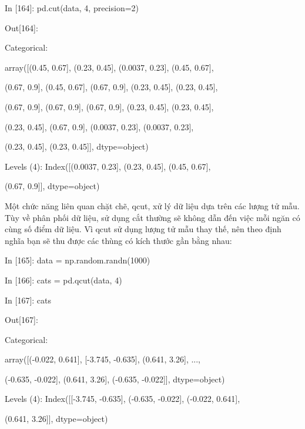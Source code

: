    \quad\textup{In [164]: pd.cut(data, 4, precision=2)  }\par
    \quad\textup{Out[164]: }\par
    \quad\textup{Categorical:   }\par
    \quad\textup{array([(0.45, 0.67], (0.23, 0.45], (0.0037, 0.23], (0.45, 0.67], }\par
    \quad\textup{\quad\quad (0.67, 0.9], (0.45, 0.67], (0.67, 0.9], (0.23, 0.45], (0.23, 0.45],    }\par
    \quad\textup{\quad\quad (0.67, 0.9], (0.67, 0.9], (0.67, 0.9], (0.23, 0.45], (0.23, 0.45], }\par
    \quad\textup{\quad\quad  (0.23, 0.45], (0.67, 0.9], (0.0037, 0.23], (0.0037, 0.23],  }\par
    \quad\textup{\quad\quad  (0.23, 0.45], (0.23, 0.45]], dtype=object) }\par
    \quad\textup{Levels (4): Index([(0.0037, 0.23], (0.23, 0.45], (0.45, 0.67], }\par
    \quad\textup{\quad\quad\quad\quad (0.67, 0.9]], dtype=object)}\par
Một chức năng liên quan chặt chẽ, qcut, xử lý dữ liệu dựa trên các lượng tử mẫu. Tùy 
về phân phối dữ liệu, sử dụng cắt thường sẽ không dẫn đến việc mỗi ngăn có 
cùng số điểm dữ liệu. Vì qcut sử dụng lượng tử mẫu thay thế, nên theo định nghĩa 
bạn sẽ thu được các thùng có kích thước gần bằng nhau:\par
    \quad\textup{In [165]: data = np.random.randn(1000)  }\par
    \quad\textup{In [166]: cats = pd.qcut(data, 4) }\par
    \quad\textup{In [167]: cats  }\par
    \quad\textup{Out[167]: }\par
    \quad\textup{Categorical:   }\par
    \quad\textup{array([(-0.022, 0.641], [-3.745, -0.635], (0.641, 3.26], ...,  }\par
    \quad\textup{\quad\quad (-0.635, -0.022], (0.641, 3.26], (-0.635, -0.022]], dtype=object)     }\par
    \quad\textup{Levels (4): Index([[-3.745, -0.635], (-0.635, -0.022], (-0.022, 0.641],  }\par
    \quad\textup{\quad\quad\quad\quad (0.641, 3.26]], dtype=object) }\par

